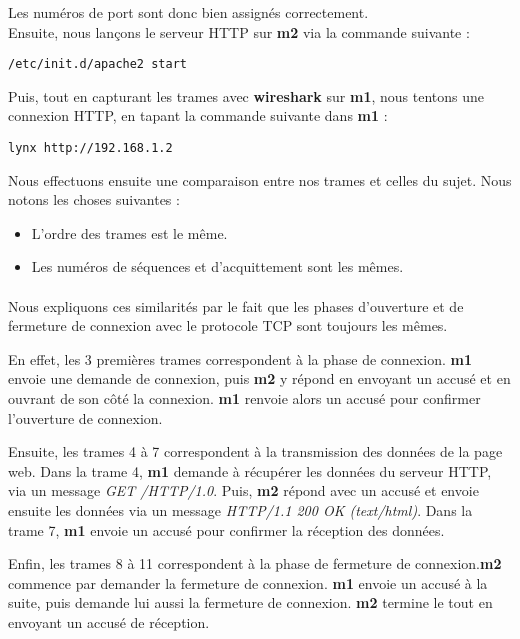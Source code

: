 \documentclass{article}
\begin{document}
Les numéros de port sont donc bien assignés correctement. \\

Ensuite, nous lançons le serveur HTTP sur \textbf{m2} via la commande suivante :
\begin{verbatim}
/etc/init.d/apache2 start
\end{verbatim}

Puis, tout en capturant les trames avec \textbf{wireshark} sur \textbf{m1}, nous tentons une connexion HTTP, en tapant la commande suivante dans \textbf{m1} :
\begin{verbatim}
lynx http://192.168.1.2
\end{verbatim}

Nous effectuons ensuite une comparaison entre nos trames et celles du sujet. Nous notons les choses suivantes :
\begin{itemize}
\item L'ordre des trames est le même.
\item Les numéros de séquences et d'acquittement sont les mêmes.
\end{itemize}
\paragraph{}{
Nous expliquons ces similarités par le fait que les phases d'ouverture et de fermeture de connexion avec le protocole TCP sont toujours les mêmes.

En effet, les 3 premières trames correspondent à la phase de connexion. \textbf{m1} envoie une demande de connexion, puis \textbf{m2} y répond en envoyant un accusé et en ouvrant de son côté la connexion. \textbf{m1} renvoie alors un accusé pour confirmer l'ouverture de connexion.

Ensuite, les trames 4 à 7 correspondent à la transmission des données de la page web. Dans la trame 4, \textbf{m1} demande à récupérer les données du serveur HTTP, via un message \textit{GET /HTTP/1.0}. Puis, \textbf{m2} répond avec un accusé et envoie ensuite les données via un message \textit{HTTP/1.1 200 OK (text/html)}. Dans la trame 7, \textbf{m1} envoie un accusé pour confirmer la réception des données.

Enfin, les trames 8 à 11 correspondent à la phase de fermeture de connexion.\textbf{m2} commence par demander la fermeture de connexion. \textbf{m1} envoie un accusé à la suite, puis demande lui aussi la fermeture de connexion. \textbf{m2} termine le tout en envoyant un accusé de réception.
}
\end{document}
